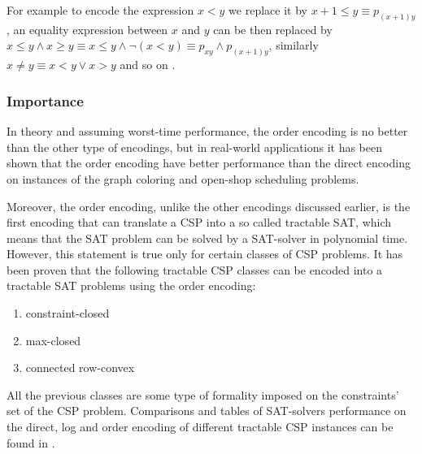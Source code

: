 For example to encode the expression $x < y$ we replace it by $x + 1 \leq y \equiv p_{(x+1)y}$, an equality expression between $x$ and $y$ can be then replaced by $x \leq y \wedge x \geq y \equiv x \leq y \wedge \neg (x < y) \equiv p_{xy} \wedge p_{(x+1)y}$, similarly $x \neq y \equiv x < y \vee x > y$ and so on \cite{tamura2008sugar}.

\subsubsection{Importance}
In theory and assuming worst-time performance, the order encoding is no better than the other type of encodings, but in real-world applications it has been shown that the order encoding have better performance than the direct encoding on instances of the graph coloring and open-shop scheduling problems. \cite{tamura2009compiling}

Moreover, the order encoding, unlike the other encodings discussed earlier, is the first encoding that can translate a CSP into a so called tractable SAT, which means that the SAT problem can be solved by a SAT-solver in polynomial time. However, this statement is true only for certain classes of CSP problems. It has been proven that the following tractable CSP classes can be encoded into a tractable SAT problems using the order encoding: \cite{petke2011order}
\begin{enumerate}
	\item constraint-closed
	\item max-closed
	\item connected row-convex
\end{enumerate}
All the previous classes are some type of formality imposed on the constraints' set of the CSP problem. Comparisons and tables of SAT-solvers performance on the direct, log and order encoding of different tractable CSP instances can be found in \cite{petke2011order}.


